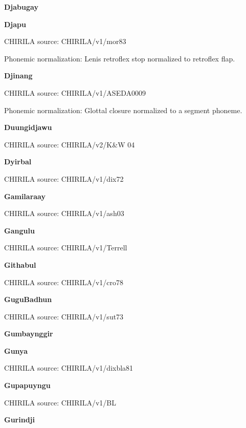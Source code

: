 \textbf{Djabugay}


\textbf{Djapu}

CHIRILA source: CHIRILA/v1/mor83


Phonemic normalization: Lenis retroflex stop normalized to retroflex
flap.

\textbf{Djinang}

CHIRILA source: CHIRILA/v1/ASEDA0009


Phonemic normalization: Glottal closure normalized to a segment phoneme.

\textbf{Duungidjawu}

CHIRILA source: CHIRILA/v2/K\&W 04


\textbf{Dyirbal}

CHIRILA source: CHIRILA/v1/dix72


\textbf{Gamilaraay}

CHIRILA source: CHIRILA/v1/ash03


\textbf{Gangulu}

CHIRILA source: CHIRILA/v1/Terrell


\textbf{Githabul}

CHIRILA source: CHIRILA/v1/cro78


\textbf{GuguBadhun}

CHIRILA source: CHIRILA/v1/sut73


\textbf{Gumbaynggir}


\textbf{Gunya}

CHIRILA source: CHIRILA/v1/dixbla81


\textbf{Gupapuyngu}

CHIRILA source: CHIRILA/v1/BL


\textbf{Gurindji}

